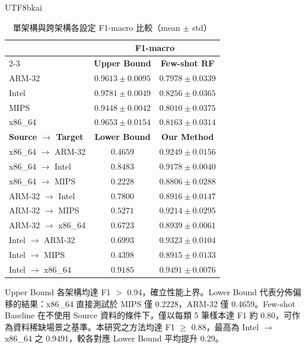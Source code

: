 \documentclass[10pt, a4paper, twocolumn]{article}
\begin{document}
\begin{CJK*}{UTF8}{bkai}
\begin{table}[htbp]
\centering
\caption{單架構與跨架構各設定 F1-macro 比較（mean $\pm$ std）}
\label{tab:all-results}
\fontsize{7.5pt}{9.5pt}\selectfont
\setlength{\tabcolsep}{4pt}
\begin{tabular}{lcc}
\toprule
& \multicolumn{2}{c}{\textbf{F1-macro}} \\
\cmidrule(lr){2-3}
\multicolumn{1}{l}{\textbf{Architecture}} & \textbf{Upper Bound} & \textbf{Few-shot RF} \\
\midrule
ARM-32  & $0.9613 \pm 0.0095$ & $0.7978 \pm 0.0339$ \\
Intel   & $0.9781 \pm 0.0049$ & $0.8256 \pm 0.0365$ \\
MIPS    & $0.9448 \pm 0.0042$ & $0.8010 \pm 0.0375$ \\
x86\_64 & $0.9653 \pm 0.0154$ & $0.8163 \pm 0.0314$ \\
\midrule
\multicolumn{1}{l}{\textbf{Source $\rightarrow$ Target}} & \textbf{Lower Bound} & \textbf{Our Method} \\
\midrule
x86\_64 $\rightarrow$ ARM-32  & $0.4659$ & $\mathbf{0.9249 \pm 0.0156}$ \\
x86\_64 $\rightarrow$ Intel   & $0.8483$ & $\mathbf{0.9178 \pm 0.0040}$ \\
x86\_64 $\rightarrow$ MIPS    & $0.2228$ & $\mathbf{0.8806 \pm 0.0288}$ \\
ARM-32  $\rightarrow$ Intel   & $0.7800$ & $\mathbf{0.8916 \pm 0.0147}$ \\
ARM-32  $\rightarrow$ MIPS    & $0.5271$ & $\mathbf{0.9214 \pm 0.0295}$ \\
ARM-32  $\rightarrow$ x86\_64 & $0.6723$ & $\mathbf{0.8939 \pm 0.0061}$ \\
Intel   $\rightarrow$ ARM-32  & $0.6993$ & $\mathbf{0.9323 \pm 0.0104}$ \\
Intel   $\rightarrow$ MIPS    & $0.4398$ & $\mathbf{0.8915 \pm 0.0133}$ \\
Intel   $\rightarrow$ x86\_64 & $0.9185$ & $\mathbf{0.9491 \pm 0.0076}$ \\
\bottomrule
\end{tabular}
\end{table}

Upper Bound 各架構均達 F1 $>$ 0.94，確立性能上界。Lower Bound 代表分佈偏移的結果：x86\_64 直接測試於 MIPS 僅 0.2228，ARM-32 僅 0.4659。Few-shot Baseline 在不使用 Source 資料的條件下，僅以每類 5 筆樣本達 F1 約 0.80，可作為資料稀缺場景之基準。本研究之方法均達 F1 $\geq$ 0.88，最高為 Intel $\rightarrow$ x86\_64 之 0.9491，較各對應 Lower Bound 平均提升 0.29。



\end{CJK*}
\end{document}
